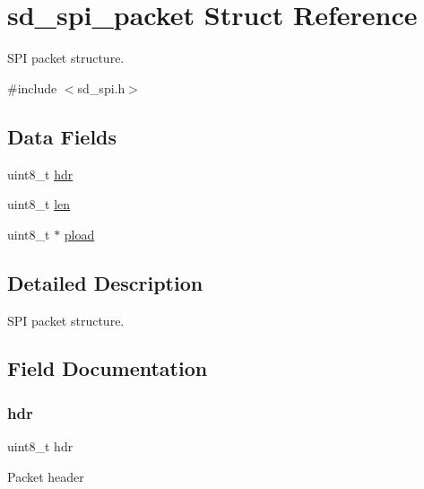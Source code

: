 \hypertarget{structsd__spi__packet}{}\section{sd\+\_\+spi\+\_\+packet Struct Reference}
\label{structsd__spi__packet}


S\+PI packet structure.  




{\ttfamily \#include $<$sd\+\_\+spi.\+h$>$}

\subsection*{Data Fields}
\begin{DoxyCompactItemize}
\item 
uint8\+\_\+t \mbox{\hyperlink{structsd__spi__packet_a85ae3ea863487ba420db83e0338c4e12}{hdr}}
\item 
uint8\+\_\+t \mbox{\hyperlink{structsd__spi__packet_a5723e60ffd628510c699eddbce90be23}{len}}
\item 
uint8\+\_\+t $\ast$ \mbox{\hyperlink{structsd__spi__packet_a9aacead5af8fd516f2301fe34ff50c29}{pload}}
\end{DoxyCompactItemize}


\subsection{Detailed Description}
S\+PI packet structure. 

\subsection{Field Documentation}
\mbox{\label{structsd__spi__packet_a85ae3ea863487ba420db83e0338c4e12}} 
\subsubsection{\texorpdfstring{hdr}{hdr}}
{\footnotesize\ttfamily uint8\+\_\+t hdr}

Packet header \mbox{\label{structsd__spi__packet_a5723e60ffd628510c699eddbce90be23}} 
